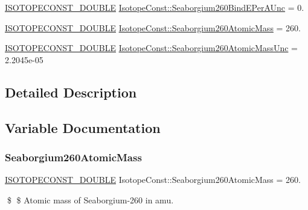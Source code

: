 \begin{DoxyCompactItemize}
\item 
\mbox{\hyperlink{group___isotope_const-_macros_ga8f45a7272ce02c0b4c65c44636ed719a}{I\+S\+O\+T\+O\+P\+E\+C\+O\+N\+S\+T\+\_\+\+D\+O\+U\+B\+LE}} \mbox{\hyperlink{group___isotope_const-_seaborgium-_sg260_ga263ff23588512644a8521b1bc86b767e}{Isotope\+Const\+::\+Seaborgium260\+Bind\+E\+Per\+A\+Unc}} = 0.
\item 
\mbox{\hyperlink{group___isotope_const-_macros_ga8f45a7272ce02c0b4c65c44636ed719a}{I\+S\+O\+T\+O\+P\+E\+C\+O\+N\+S\+T\+\_\+\+D\+O\+U\+B\+LE}} \mbox{\hyperlink{group___isotope_const-_seaborgium-_sg260_gab6e5140fb591bb1e99eb4cade5adc748}{Isotope\+Const\+::\+Seaborgium260\+Atomic\+Mass}} = 260.
\item 
\mbox{\hyperlink{group___isotope_const-_macros_ga8f45a7272ce02c0b4c65c44636ed719a}{I\+S\+O\+T\+O\+P\+E\+C\+O\+N\+S\+T\+\_\+\+D\+O\+U\+B\+LE}} \mbox{\hyperlink{group___isotope_const-_seaborgium-_sg260_gafa55561d20b62a8f2c3a3540ca292995}{Isotope\+Const\+::\+Seaborgium260\+Atomic\+Mass\+Unc}} = 2.\+2045e-\/05
\end{DoxyCompactItemize}


\subsection{Detailed Description}


\subsection{Variable Documentation}
\mbox{\label{group___isotope_const-_seaborgium-_sg260_gab6e5140fb591bb1e99eb4cade5adc748}} 
\subsubsection{\texorpdfstring{Seaborgium260\+Atomic\+Mass}{Seaborgium260AtomicMass}}
{\footnotesize\ttfamily \mbox{\hyperlink{group___isotope_const-_macros_ga8f45a7272ce02c0b4c65c44636ed719a}{I\+S\+O\+T\+O\+P\+E\+C\+O\+N\+S\+T\+\_\+\+D\+O\+U\+B\+LE}} Isotope\+Const\+::\+Seaborgium260\+Atomic\+Mass = 260.}

\$ \$ Atomic mass of Seaborgium-\/260 in amu. \mbox{\label{group___isotope_const-_seaborgium-_sg260_gafa55561d20b62a8f2c3a3540ca292995}} 
